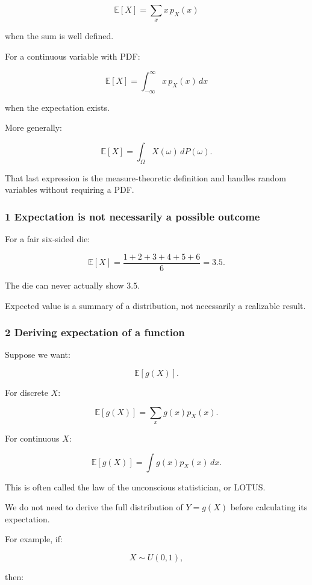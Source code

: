 \[
 \boxed{ \mathbb E[X]=\sum_xx\,p_X(x) }
\]

when the sum is well defined.

For a continuous variable with PDF:

\[
 \boxed{ \mathbb E[X]= \int_{-\infty}^{\infty}x\,p_X(x)\,dx }
\]

when the expectation exists.

More generally:

\[
 \mathbb E[X]=\int_\Omega X(\omega)\,dP(\omega).
\]

That last expression is the measure-theoretic definition and handles random variables without requiring a PDF.

\subsubsection{1 Expectation is not necessarily a possible outcome}\label{02-foundations-ii-ch023-expectation-is-not-necessarily-a-possible-outcome}

For a fair six-sided die:

\[
 \mathbb E[X] = \frac{1+2+3+4+5+6}{6} =\boxed{3.5}.
\]

The die can never actually show \(3.5\).

Expected value is a summary of a distribution, not necessarily a realizable result.

\subsubsection{2 Deriving expectation of a function}\label{02-foundations-ii-ch023-deriving-expectation-of-a-function}

Suppose we want:

\[
 \mathbb E[g(X)].
\]

For discrete \(X\):

\[
 \boxed{ \mathbb E[g(X)] = \sum_xg(x)p_X(x) }.
\]

For continuous \(X\):

\[
 \boxed{ \mathbb E[g(X)] = \int g(x)p_X(x)\,dx }.
\]

This is often called the law of the unconscious statistician, or LOTUS.

We do not need to derive the full distribution of \(Y=g(X)\) before calculating its expectation.

For example, if:

\[
 X\sim U(0,1),
\]

then:

